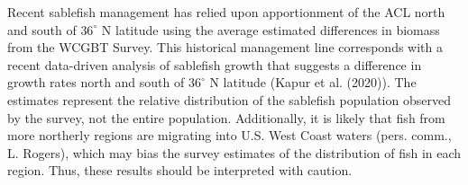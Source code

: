 \documentclass[11pt,
  english,
  a4paper,
]{article}
\begin{document}
\leavevmode\tagmcend\tagstructend


Recent sablefish management has relied upon apportionment of the ACL north and south of {\(36^\circ\)\leavevmode\tagmcend\tagstructend} N latitude using the average estimated differences in biomass from the WCGBT Survey. This historical management line corresponds with a recent data-driven analysis of sablefish growth that suggests a difference in growth rates north and south of {\(36^\circ\)\leavevmode\tagmcend\tagstructend} N latitude ({Kapur et al. (2020)\leavevmode\tagmcend\tagstructend}). The estimates represent the relative distribution of the sablefish population observed by the survey, not the entire population. Additionally, it is likely that fish from more northerly regions are migrating into U.S. West Coast waters (pers. comm., L. Rogers), which may bias the survey estimates of the distribution of fish in each region. Thus, these results should be interpreted with caution.

\leavevmode\tagmcend\tagstructend\par

\end{document}
